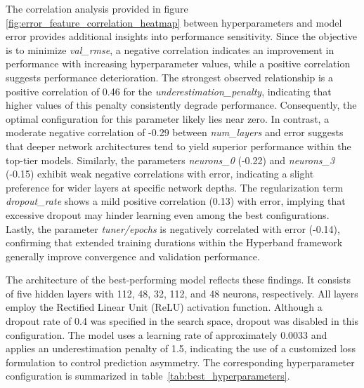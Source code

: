 The correlation analysis provided in figure \ref{fig:error_feature_correlation_heatmap} between hyperparameters and model error provides additional insights into performance sensitivity. Since the objective is to minimize \textit{val\_rmse}, a negative correlation indicates an improvement in performance with increasing hyperparameter values, while a positive correlation suggests performance deterioration. The strongest observed relationship is a positive correlation of 0.46 for the \textit{underestimation\_penalty}, indicating that higher values of this penalty consistently degrade performance. Consequently, the optimal configuration for this parameter likely lies near zero. In contrast, a moderate negative correlation of -0.29 between \textit{num\_layers} and error suggests that deeper network architectures tend to yield superior performance within the top-tier models. Similarly, the parameters \textit{neurons\_0} (-0.22) and \textit{neurons\_3} (-0.15) exhibit weak negative correlations with error, indicating a slight preference for wider layers at specific network depths. The regularization term \textit{dropout\_rate} shows a mild positive correlation (0.13) with error, implying that excessive dropout may hinder learning even among the best configurations. Lastly, the parameter \textit{tuner/epochs} is negatively correlated with error (-0.14), confirming that extended training durations within the Hyperband framework generally improve convergence and validation performance.

The architecture of the best-performing model reflects these findings. It consists of five hidden layers with 112, 48, 32, 112, and 48 neurons, respectively. All layers employ the Rectified Linear Unit (ReLU) activation function. Although a dropout rate of 0.4 was specified in the search space, dropout was disabled in this configuration. The model uses a learning rate of approximately 0.0033 and applies an underestimation penalty of 1.5, indicating the use of a customized loss formulation to control prediction asymmetry. The corresponding hyperparameter configuration is summarized in table~\ref{tab:best_hyperparameters}.

